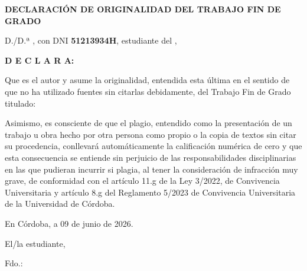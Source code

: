 \documentclass[a4paper, 12pt]{article}
\begin{document}
\setlength{\parskip}{5mm} %


\clearpage

\thispagestyle{empty}
\enlargethispage{3cm}
\begin{center}
    \large\textbf{DECLARACIÓN DE ORIGINALIDAD DEL TRABAJO FIN DE GRADO}
\end{center}
\vspace{0.4cm}

\noindent D./D.ª \textbf{\AutorTFG}, con DNI \textbf{51213934H}, estudiante del \textbf{\Grado},

\vspace{0.3cm}

\noindent \textbf{D E C L A R A:}

\noindent Que es el autor y asume la originalidad, entendida esta última en el sentido de que no ha utilizado fuentes sin citarlas debidamente, del Trabajo Fin de Grado titulado:

\vspace{0.3cm}
\begin{center}
    \textbf{\large \TituloTFG}
\end{center}
\vspace{0.3cm}

\noindent Asimismo, es consciente de que el plagio, entendido como la presentación de un trabajo u obra hecho por otra persona como propio o la copia de textos sin citar su procedencia, conllevará automáticamente la calificación numérica de cero y que esta consecuencia se entiende sin perjuicio de las responsabilidades disciplinarias en las que pudieran incurrir si plagia, al tener la consideración de infracción muy grave, de conformidad con el artículo 11.g de la Ley 3/2022, de Convivencia Universitaria y artículo 8.g del Reglamento 5/2023 de Convivencia Universitaria de la Universidad de Córdoba.

\vspace{0.6cm}

\noindent En Córdoba, a 09 de junio de 2026.

\vspace{0.6cm}

\begin{center}
    El/la estudiante,
\end{center}

\vfill

\begin{center}
    Fdo.: \AutorTFG
\end{center}
\end{document}
